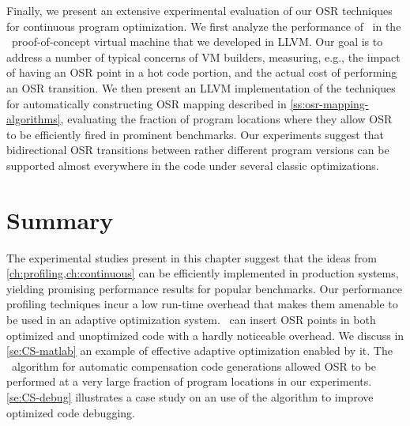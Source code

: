 Finally, we present an extensive experimental evaluation of our OSR techniques for continuous program optimization. We first analyze the performance of \osrkit\ in the \tinyvm\ proof-of-concept virtual machine that we developed in LLVM. Our goal is to address a number of typical concerns of VM builders, measuring, e.g., the impact of having an OSR point in a hot code portion, and the actual cost of performing an OSR transition. We then present an LLVM implementation of the techniques for automatically constructing OSR mapping described in \mysection\ref{ss:osr-mapping-algorithms}, evaluating the fraction of program locations where they allow OSR to be efficiently fired in prominent benchmarks. Our experiments suggest that bidirectional OSR transitions between rather different program versions can be supported almost everywhere in the code under several classic optimizations.

\ifdefined \noauthorea



\fi

\section{Summary}
The experimental studies present in this chapter suggest that the ideas from \mychapter\ref{ch:profiling,ch:continuous} can be efficiently implemented in production systems, yielding promising performance results for popular benchmarks. Our performance profiling techniques incur a low run-time overhead that makes them amenable to be used in an adaptive optimization system. \osrkit\ can insert OSR points in both optimized and unoptimized code with a hardly noticeable overhead. We discuss in \mysection\ref{se:CS-matlab} an example of effective adaptive optimization enabled by it. The \buildcomp\ algorithm for automatic compensation code generations allowed OSR to be performed at a very large fraction of program locations in our experiments. \mysection\ref{se:CS-debug} illustrates a case study on an use of the algorithm to improve optimized code debugging.
